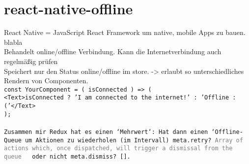 \section{react-native-offline}
React Native = JavaScript React Framework um native, mobile Apps zu bauen. blabla\\
Behandelt online/offline Verbindung. Kann die Internetverbindung auch regelmäßig prüfen\\
Speichert nur den Status online/offline im store. -> erlaubt so unterschiedliches Rendern von Componenten.\\

\tt{const YourComponent = ({ isConnected }) => (\\
  <Text>{isConnected ? 'I am connected to the internet!' : 'Offline :('}</Text>\\
  );\\}\\
  Zusammen mir Redux hat es einen `Mehrwert`:
  Hat dann einen `Offline-\gls{Queue} um Aktionen zu wiederholen (im Intervall) \tt{meta.retry? \textcolor{gray}  {Array of actions which, once dispatched, will trigger a dismissal from the queue}} ~ oder nicht \tt{meta.dismiss? []}.\cite{rn-offline-gh}
